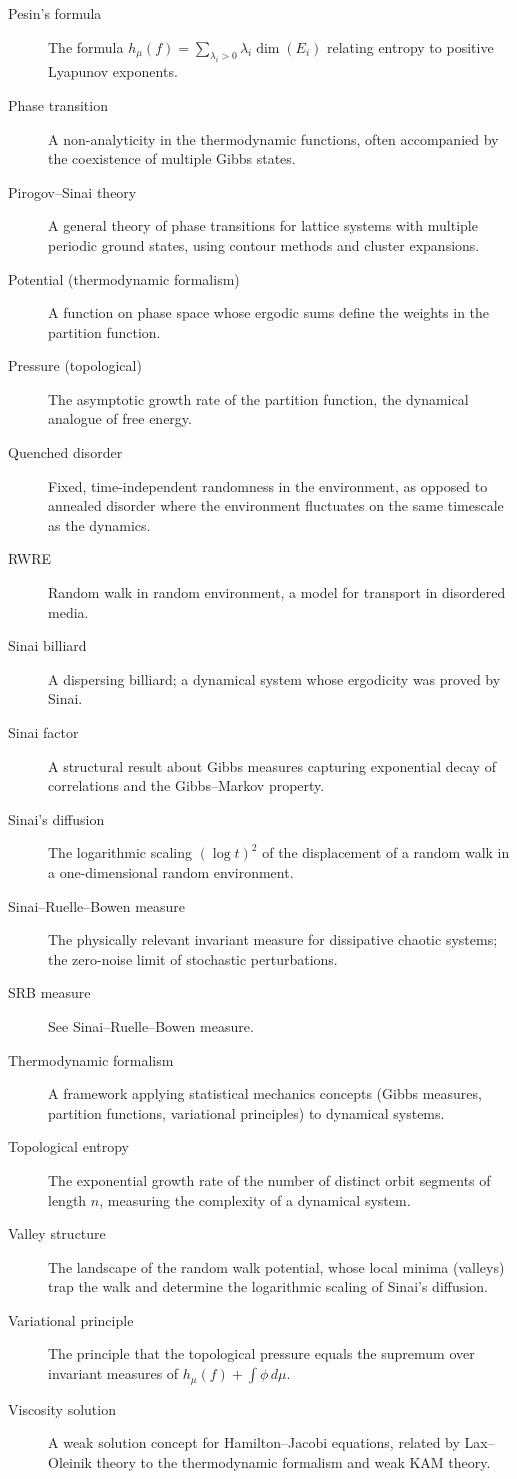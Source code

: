 \begin{description}
  \item[Pesin's formula] The formula \(h_\mu(f) = \sum_{\lambda_i > 0} \lambda_i \dim(E_i)\) relating entropy to positive Lyapunov exponents.
  \item[Phase transition] A non-analyticity in the thermodynamic functions, often accompanied by the coexistence of multiple Gibbs states.
  \item[Pirogov--Sinai theory] A general theory of phase transitions for lattice systems with multiple periodic ground states, using contour methods and cluster expansions.
  \item[Potential (thermodynamic formalism)] A function on phase space whose ergodic sums define the weights in the partition function.
  \item[Pressure (topological)] The asymptotic growth rate of the partition function, the dynamical analogue of free energy.
  \item[Quenched disorder] Fixed, time-independent randomness in the environment, as opposed to annealed disorder where the environment fluctuates on the same timescale as the dynamics.
  \item[RWRE] Random walk in random environment, a model for transport in disordered media.
  \item[Sinai billiard] A dispersing billiard; a dynamical system whose ergodicity was proved by Sinai.
  \item[Sinai factor] A structural result about Gibbs measures capturing exponential decay of correlations and the Gibbs--Markov property.
  \item[Sinai's diffusion] The logarithmic scaling \((\log t)^2\) of the displacement of a random walk in a one-dimensional random environment.
  \item[Sinai--Ruelle--Bowen measure] The physically relevant invariant measure for dissipative chaotic systems; the zero-noise limit of stochastic perturbations.
  \item[SRB measure] See Sinai--Ruelle--Bowen measure.
  \item[Thermodynamic formalism] A framework applying statistical mechanics concepts (Gibbs measures, partition functions, variational principles) to dynamical systems.
  \item[Topological entropy] The exponential growth rate of the number of distinct orbit segments of length \(n\), measuring the complexity of a dynamical system.
  \item[Valley structure] The landscape of the random walk potential, whose local minima (valleys) trap the walk and determine the logarithmic scaling of Sinai's diffusion.
  \item[Variational principle] The principle that the topological pressure equals the supremum over invariant measures of \(h_\mu(f) + \int \phi\, d\mu\).
  \item[Viscosity solution] A weak solution concept for Hamilton--Jacobi equations, related by Lax--Oleinik theory to the thermodynamic formalism and weak KAM theory.
\end{description}

